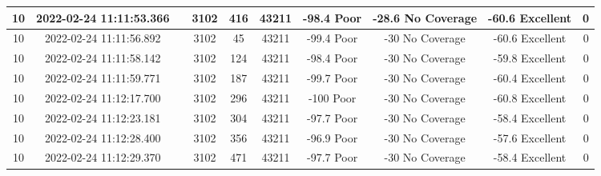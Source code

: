\begin{longtable*}{|c|c|c|c|c|c|c|c|c|c|}
10&2022-02-24 11:11:53.366&&3102&416&43211& -98.4     Poor        & -28.6     No Coverage & -60.6     Excellent   & 0\\\hline
{}10&2022-02-24 11:11:56.892&&3102&45&43211& -99.4     Poor        & -30       No Coverage & -60.6     Excellent   & 0\\\hline
{}10&2022-02-24 11:11:58.142&&3102&124&43211& -98.4     Poor        & -30       No Coverage & -59.8     Excellent   & 0\\\hline
{}10&2022-02-24 11:11:59.771&&3102&187&43211& -99.7     Poor        & -30       No Coverage & -60.4     Excellent   & 0\\\hline
{}10&2022-02-24 11:12:17.700&&3102&296&43211& -100      Poor        & -30       No Coverage & -60.8     Excellent   & 0\\\hline
{}10&2022-02-24 11:12:23.181&&3102&304&43211& -97.7     Poor        & -30       No Coverage & -58.4     Excellent   & 0\\\hline
{}10&2022-02-24 11:12:28.400&&3102&356&43211& -96.9     Poor        & -30       No Coverage & -57.6     Excellent   & 0\\\hline
{}10&2022-02-24 11:12:29.370&&3102&471&43211& -97.7     Poor        & -30       No Coverage & -58.4     Excellent   & 0\\\hline

\end{longtable*}
